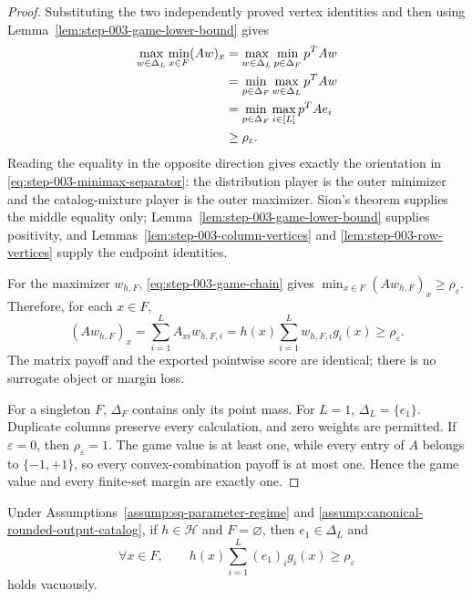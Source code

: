 \begin{proof}
Substituting the two independently proved vertex identities and then using
Lemma~\ref{lem:step-003-game-lower-bound} gives
\begin{align}
\max_{w\in\Delta_L}\min_{x\in F}(Aw)_x
&=\max_{w\in\Delta_L}\min_{p\in\Delta_F}p^{T}Aw \notag\\
&=\min_{p\in\Delta_F}\max_{w\in\Delta_L}p^{T}Aw \notag\\
&=\min_{p\in\Delta_F}\max_{i\in[L]}p^{T}Ae_i \notag\\
&\ge\rho_{\varepsilon}.
\label{eq:step-003-game-chain}
\end{align}
Reading the equality in the opposite direction gives exactly the orientation
in \eqref{eq:step-003-minimax-separator}: the distribution player is the
outer minimizer and the catalog-mixture player is the outer maximizer.
Sion's theorem supplies the middle equality only;
Lemma~\ref{lem:step-003-game-lower-bound} supplies positivity, and
Lemmas~\ref{lem:step-003-column-vertices} and
\ref{lem:step-003-row-vertices} supply the endpoint identities.

For the maximizer \(w_{h,F}\), \eqref{eq:step-003-game-chain} gives
\(\min_{x\in F}(Aw_{h,F})_x\ge\rho_{\varepsilon}\).  Therefore, for each
\(x\in F\),
\begin{equation}
(Aw_{h,F})_x
=\sum_{i=1}^LA_{xi}w_{h,F,i}
=h(x)\sum_{i=1}^Lw_{h,F,i}g_i(x)
\ge\rho_{\varepsilon}.
\label{eq:step-003-matrix-pointwise-identity}
\end{equation}
The matrix payoff and the exported pointwise score are identical; there is no
surrogate object or margin loss.

For a singleton \(F\), \(\Delta_F\) contains only its point mass.  For
\(L=1\), \(\Delta_L=\{e_1\}\).  Duplicate columns preserve every
calculation, and zero weights are permitted.  If \(\varepsilon=0\), then
\(\rho_{\varepsilon}=1\).  The game value is at least one, while every entry
of \(A\) belongs to \(\{-1,+1\}\), so every convex-combination payoff is at
most one.  Hence the game value and every finite-set margin are exactly one.
\end{proof}

\begin{lemma}
\label{lem:step-003-empty-restriction}
Under Assumptions~\ref{assump:sq-parameter-regime} and
\ref{assump:canonical-rounded-output-catalog}, if \(h\in\mathcal H\) and
\(F=\varnothing\), then \(e_1\in\Delta_L\) and
\[
\forall x\in F,
\qquad
h(x)\sum_{i=1}^L(e_1)_ig_i(x)\ge\rho_{\varepsilon}
\]
holds vacuously.
\end{lemma}

